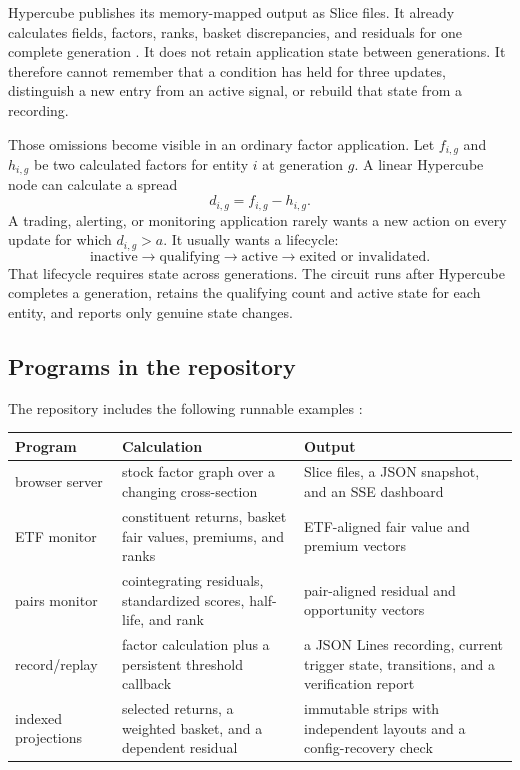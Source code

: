 \documentclass{strategynet-journal}
\newcommand{\SLICE}{\textsf{Slice}}
\begin{document}
\begin{SNcolumns}

Hypercube publishes its memory-mapped output as \SLICE{} files.  It already
calculates fields, factors, ranks, basket discrepancies, and residuals for one
complete generation \cite{partone}.  It does not retain application state
between generations.  It therefore cannot remember that a condition has held
for three updates, distinguish a new entry from an active signal, or rebuild
that state from a recording.

Those omissions become visible in an ordinary factor application.  Let
\(f_{i,g}\) and \(h_{i,g}\) be two calculated factors for entity \(i\) at
generation \(g\).  A linear Hypercube node can calculate a spread
\[
  d_{i,g}=f_{i,g}-h_{i,g}.
\]
A trading, alerting, or monitoring application rarely wants a new action on
every update for which \(d_{i,g}>a\).  It usually wants a lifecycle:
\[
  \text{inactive}\rightarrow\text{qualifying}\rightarrow
  \text{active}\rightarrow\text{exited or invalidated}.
\]
That lifecycle requires state across generations.  The circuit runs after
Hypercube completes a generation, retains the qualifying count and active
state for each entity, and reports only genuine state changes.

\end{SNcolumns}

\clearpage
\subsection{Programs in the repository}

The repository includes the following runnable examples \cite{repository}:
\begin{center}
\small
\begin{tabularx}{\textwidth}{@{}P{0.20\textwidth}P{0.32\textwidth}X@{}}
\toprule
Program & Calculation & Output \\
\midrule
browser server &
stock factor graph over a changing cross-section &
\SLICE{} files, a JSON snapshot, and an SSE dashboard \\
ETF monitor &
constituent returns, basket fair values, premiums, and ranks &
ETF-aligned fair value and premium vectors \\
pairs monitor &
cointegrating residuals, standardized scores, half-life, and rank &
pair-aligned residual and opportunity vectors \\
record/replay &
factor calculation plus a persistent threshold callback &
a JSON Lines recording, current trigger state, transitions, and a verification report \\
indexed projections &
selected returns, a weighted basket, and a dependent residual &
immutable strips with independent layouts and a config-recovery check \\
\bottomrule
\end{tabularx}
\end{center}
\end{document}

